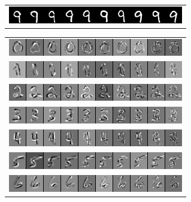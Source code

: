\begin{figure}
\begin{subfigure}{0.45\textwidth}
\begin{tabular}{c}
  \includegraphics[width=0.90\linewidth]{predoc/images/9_ppv.png}
\end{tabular}
\label{fig:mnistppv}
\end{subfigure}
\begin{subfigure}{0.45\textwidth}
\begin{tabular}{c}
  \includegraphics[width=0.9\linewidth]{predoc/images/0_eigenvectors.png}\\
  \includegraphics[width=0.90\linewidth]{predoc/images/1_eigenvectors.png}\\
  \includegraphics[width=0.90\linewidth]{predoc/images/2_eigenvectors.png}\\
  \includegraphics[width=0.90\linewidth]{predoc/images/3_eigenvectors.png}\\
  \includegraphics[width=0.90\linewidth]{predoc/images/4_eigenvectors.png}\\
  \includegraphics[width=0.90\linewidth]{predoc/images/5_eigenvectors.png}\\
  \includegraphics[width=0.90\linewidth]{predoc/images/6_eigenvectors.png}\\

\end{tabular}
\end{subfigure}
\end{figure}
